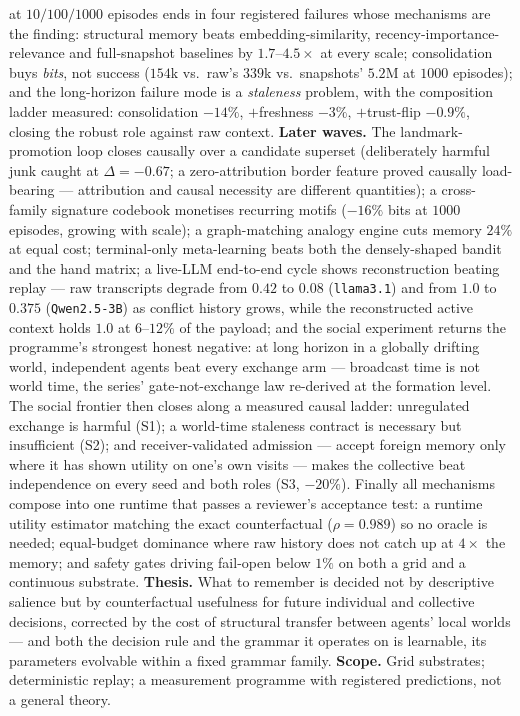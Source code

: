 \documentclass{article}
\begin{document}
at $10/100/1000$ episodes ends in four registered failures whose
mechanisms are the finding: structural memory beats
embedding-similarity, recency-importance-relevance and full-snapshot
baselines by $1.7$--$4.5\times$ at every scale; consolidation buys
\emph{bits}, not success ($154$k vs.\ raw's $339$k vs.\ snapshots'
$5.2$M at $1000$ episodes); and the long-horizon failure mode is a
\emph{staleness} problem, with the composition ladder measured:
consolidation $-14\%$, $+$freshness $-3\%$, $+$trust-flip $-0.9\%$,
closing the robust role against raw context.
\textbf{Later waves.} The landmark-promotion loop closes causally
over a candidate superset (deliberately harmful junk caught at
$\Delta=-0.67$; a zero-attribution border feature proved causally
load-bearing --- attribution and causal necessity are different
quantities); a cross-family signature codebook monetises recurring
motifs ($-16\%$ bits at $1000$ episodes, growing with scale); a
graph-matching analogy engine cuts memory $24\%$ at equal cost;
terminal-only meta-learning beats both the densely-shaped bandit and
the hand matrix; a live-LLM end-to-end cycle shows reconstruction
beating replay --- raw transcripts degrade from $0.42$ to $0.08$
(\texttt{llama3.1}) and from $1.0$ to $0.375$ (\texttt{Qwen2.5-3B})
as conflict history grows, while the reconstructed active context
holds $1.0$ at $6$--$12\%$ of the payload; and the social experiment
returns the programme's strongest honest negative: at long horizon in
a globally drifting world, independent agents beat every exchange arm
--- broadcast time is not world time, the series' gate-not-exchange
law re-derived at the formation level. The social frontier then
closes along a measured causal ladder: unregulated exchange is
harmful (S1); a world-time staleness contract is necessary but
insufficient (S2); and receiver-validated admission --- accept
foreign memory only where it has shown utility on one's own visits
--- makes the collective beat independence on every seed and both
roles (S3, $-20\%$). Finally all mechanisms compose into one runtime
that passes a reviewer's acceptance test: a runtime utility estimator
matching the exact counterfactual ($\rho{=}0.989$) so no oracle is
needed; equal-budget dominance where raw history does not catch up at
$4\times$ the memory; and safety gates driving fail-open below $1\%$
on both a grid and a continuous substrate.
\textbf{Thesis.} What to remember is decided not by descriptive
salience but by counterfactual usefulness for future individual and
collective decisions, corrected by the cost of structural transfer
between agents' local worlds --- and both the decision rule and the
grammar it operates on is learnable, its parameters evolvable within
a fixed grammar family.
\textbf{Scope.} Grid substrates; deterministic replay; a measurement
programme with registered predictions, not a general theory.
\end{document}

